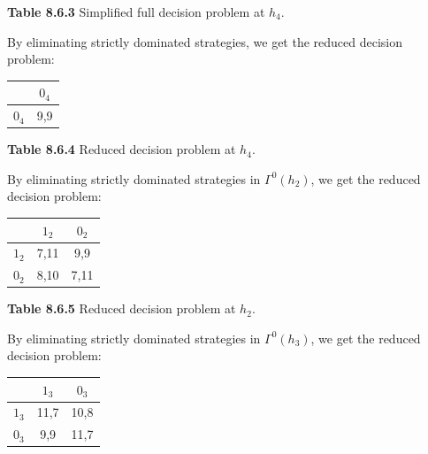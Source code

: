 \documentclass{article}
\begin{document}
\begin{description}
\begin{center}
        {\bf Table 8.6.3} Simplified full decision problem at $h_4$.
    \end{center}
    By eliminating strictly dominated strategies, we get the reduced decision problem:
    \begin{center}
        \begin{tabular}{cc}
        \hline
        \hline
                   &          $0_4$ \\
        \hline
                 $0_4$ &        9,9 \\
        \hline
        \end{tabular}

        {\bf Table 8.6.4} Reduced decision problem at $h_4$.
    \end{center}

    By eliminating strictly dominated strategies in $\Gamma ^0\left(h_2\right)$, we get the reduced decision problem:
    \begin{center}
        \begin{tabular}{ccc}
        \hline
        \hline
                   &          $1_2$ &          $0_2$ \\
        \hline
                 $1_2$ &       7,11 &        9,9 \\

                 $0_2$ &       8,10 &       7,11 \\
        \hline
        \end{tabular}

        {\bf Table 8.6.5} Reduced decision problem at $h_2$.
    \end{center}

    By eliminating strictly dominated strategies in $\Gamma ^0\left(h_3\right)$, we get the reduced decision problem:
     \begin{center}
        \begin{tabular}{ccc}
        \hline
        \hline
                   &          $1_3$ &          $0_3$ \\
        \hline
                 $1_3$ &       11,7 &       10,8 \\

                 $0_3$ &        9,9 &       11,7 \\
        \hline
        \end{tabular}


\end{center}
\end{description}
\end{document}
